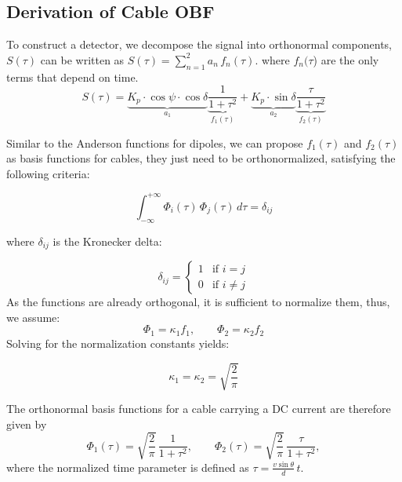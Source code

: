 \subsection{Derivation of Cable OBF}\label{sec:signal_representation}
To construct a detector, we decompose the signal into orthonormal components, \(S(\tau)\) can be written as \(S(\tau) = \sum_{n=1}^{2} a_n\, f_n(\tau).\)
where \(f_n(\tau\)) are the only terms that depend on time.
\begin{equation*}
    S(\tau) = \underbrace{K_p \cdot\cos\psi \cdot \cos\delta }_{{a_1}}                
              \underbrace{\frac{1}{1+\tau^2}}_{{f_1(\tau)}}
              +
              \underbrace{K_p \cdot\sin\delta}_{{a_2}}              
              \underbrace{\frac{\tau}{1+\tau^2}}_{{f_2(\tau)}}
\end{equation*}

Similar to the Anderson functions for dipoles, we can propose \(f_1(\tau)\) and \(f_2(\tau)\) as basis functions for cables, they just need to be orthonormalized, satisfying the following criteria:

\begin{equation*}
    \int_{-\infty}^{+\infty} \Phi_i(\tau)\, \Phi_j(\tau)\, d\tau = \delta_{ij}
\end{equation*}

where $\delta_{ij}$ is the Kronecker delta:

\[
    \delta_{ij} =
    \begin{cases}
        1 & \text{if } i = j \\
        0 & \text{if } i \neq j
    \end{cases}
\]
As the functions are already orthogonal, it is sufficient to normalize them, thus, we assume:
\begin{equation*}
    \Phi_1 = \kappa_1 f_1, \qquad \Phi_2 = \kappa_2 f_2
\end{equation*}
Solving for the normalization constants yields:

\begin{equation*}
    \kappa_1 = \kappa_2 = \sqrt{\frac{2}{\pi}}
\end{equation*}

The orthonormal basis functions for a cable carrying a DC current are therefore given by
\begin{equation}
    \Phi_1(\tau) = \sqrt{\frac{2}{\pi}}\,\frac{1}{1+\tau^2}, \qquad
    \Phi_2(\tau) = \sqrt{\frac{2}{\pi}}\,\frac{\tau}{1+\tau^2},
    \label{eq:OBF}
\end{equation}
where the normalized time parameter is defined as \(\tau = \frac{v\sin\theta}{d}\,t\).

